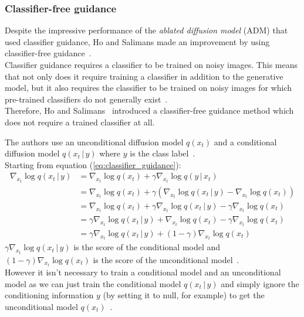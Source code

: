 \documentclass{article}
\numberwithin{equation}{section}
\numberwithin{figure}{section}
\begin{document}
\subsubsection{Classifier-free guidance}
Despite the impressive performance of the \textit{ablated diffusion model} (ADM) that used classifier guidance, Ho and Salimans made an improvement by using classifier-free guidance~\cite{ho2022classifierfree}. \\
Classifier guidance requires a classifier to be trained on noisy images. This means that not only does it require training a classifier in addition to the generative model, but it also requires the classifier to be trained on noisy images for which pre-trained classifiers do not generally exist~\cite{ho2022classifierfree}. \\
Therefore, Ho and Salimans~\cite{ho2022classifierfree} introduced a classifier-free guidance method which does not require a trained classifier at all. 

The authors use an unconditional diffusion model $q(x_t)$ and a conditional diffusion model $q(x_t \, | \, y)$ where $y$ is the class label~\cite{ho2022classifierfree, luo2022understanding}. \\
Starting from equation (\ref{eq:classifier_guidance}):
\begin{align}
  \nabla_{x_t} \log q(x_t \, | \, y) &= \nabla_{x_t} \log q(x_t) + \gamma \nabla_{x_t} \log q(y \, | \, x_t) \\
  &= \nabla_{x_t} \log q(x_t) + \gamma \left( \nabla_{x_t} \log q (x_t \, | \, y) - \nabla_{x_t} \log q(x_t) \right) \\
  &= \nabla_{x_t} \log q(x_t) + \gamma \nabla_{x_t} \log q (x_t \, | \, y) - \gamma \nabla_{x_t} \log q(x_t) \\
  &= \gamma \nabla_{x_t} \log q (x_t \, | \, y) + \nabla_{x_t} \log q(x_t) - \gamma \nabla_{x_t} \log q(x_t) \\
  &= \gamma \nabla_{x_t} \log q (x_t \, | \, y) + (1 - \gamma) \nabla_{x_t} \log q(x_t)
\end{align}
$\gamma \nabla_{x_t} \log q (x_t \, | \, y)$ is the score of the conditional model and $(1 - \gamma) \nabla_{x_t} \log q(x_t)$ is the score of the unconditional model~\cite{luo2022understanding}. \\
However it isn't necessary to train a conditional model and an unconditional model as we can just train the conditional model $q(x_t \, | \, y)$ and simply ignore the conditioning information $y$ (by setting it to null, for example) to get the unconditional model $q(x_t)$~\cite{ho2022classifierfree,luo2022understanding}. \\
\newpage
\end{document}
